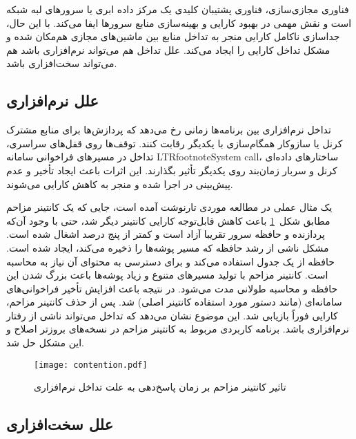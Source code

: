 فناوری مجازی‌سازی، فناوری پشتیبان کلیدی یک مرکز داده ابری یا سرورهای لبه شبکه است و نقش مهمی در بهبود کارایی و بهینه‌سازی منابع سرورها ایفا می‌کند. با این حال، جداسازی ناکامل کارایی منجر به تداخل منابع بین ماشین‌های مجازی هم‌مکان شده و مشکل تداخل کارایی را ایجاد می‌کند. علل تداخل هم می‌تواند نرم‌افزاری باشد هم می‌تواند سخت‌افزاری باشد.

\subsection{علل نرم‌افزاری}

تداخل نرم‌افزاری بین برنامه‌ها زمانی رخ می‌دهد که پردازش‌ها برای منابع مشترک کرنل یا سازوکار همگام‌سازی با یکدیگر رقابت کنند. توقف‌ها روی قفل‌های سراسری، تداخل در مسیرهای فراخوانی سامانه LTRfootnote{System call}، ساختارهای داده‌ای کرنل و سربار زمان‌بند روی یکدیگر تأثیر بگذارند. این اثرات باعث ایجاد تأخیر و عدم پیش‌بینی در اجرا شده و منجر به کاهش کارایی می‌شوند.

یک مثال عملی در مطالعه موردی تارنوشت  آمده است\cite{sysdig2017isolation}، جایی که یک کانتینر مزاحم مطابق شکل~\ref{figure:software_contention} باعث کاهش قابل‌توجه کارایی کانتینر دیگر شد، حتی با وجود آن‌که پردازنده و حافظه سرور تقریبا آزاد است و کمتر از پنج درصد اشغال شده است. مشکل ناشی از رشد حافظه  که مسیر پوشه‌ها را ذخیره‌ می‌کند، ایجاد شده است. حافظه  از یک جدول  استفاده می‌کند و برای دسترسی به محتوای آن نیاز به محاسبه  است. کانتینر مزاحم با تولید مسیرهای متنوع و زیاد پوشه‌ها باعث بزرگ شدن این حافظه و محاسبه طولانی مدت  می‌شود. در نتیجه باعث افزایش تأخیر فراخوانی‌های سامانه‌ای (مانند دستور  مورد استفاده کانتینر اصلی) شد. پس از حذف کانتینر مزاحم، کارایی فوراً بازیابی شد. این موضوع نشان می‌دهد که تداخل می‌تواند ناشی از رفتار نرم‌افزاری باشد. برنامه کاربردی مربوط به کانتینر مزاحم در نسخه‌های بروز‌تر اصلاح و این مشکل حل شد.

\vspace{0.5cm}
\begin{figure}[h]
\centering
\texttt{[image: contention.pdf]}
\caption{تاثیر کانتینر مزاحم بر زمان پاسخ‌دهی به علت تداخل نرم‌افزاری\cite{sysdig2017isolation}}
\label{figure:software_contention}
\end{figure}
\vspace{0.5cm}

\subsection{علل سخت‌افزاری}


